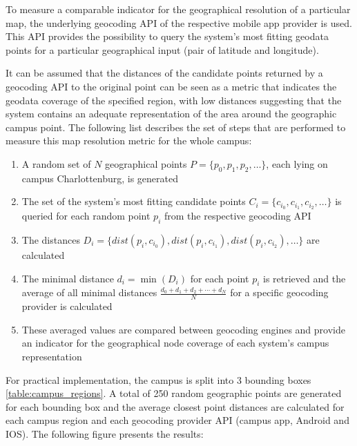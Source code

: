 To measure a comparable indicator for the geographical resolution of a particular map, the underlying geocoding API of the respective mobile app provider is used. This API provides the possibility to query the system's most fitting geodata points for a particular geographical input (pair of latitude and longitude).

It can be assumed that the distances of the candidate points returned by a geocoding API to the original point can be seen as a metric that indicates the geodata coverage of the specified region, with low distances suggesting that the system contains an adequate representation of the area around the geographic campus point. The following list describes the set of steps that are performed to measure this map resolution metric for the whole campus:

\newpage

\begin{enumerate}
    \item A random set of $N$ geographical points $P = \{p_{0}, p_{1}, p_{2}, \ldots\}$, each lying on campus Charlottenburg, is generated
    \item The set of the system's most fitting candidate points $C_{i} = \{c_{i_{0}}, c_{i_{1}}, c_{i_{2}}, \ldots\}$ is queried for each random point $p_{i}$ from the respective geocoding API
    \item The distances $D_{i} = \{dist(p_{i}, c_{i_{0}}), dist(p_{i}, c_{i_{1}}), dist(p_{i}, c_{i_{2}}), \ldots\}$ are calculated
    \item The minimal distance $d_{i} = \min(D_{i})$ for each point $p_{i}$ is retrieved and the average of all minimal distances $\frac{d_{0} + d_{1} + d_{2} + \cdots + d_{N}}{N}$ for a specific geocoding provider is calculated
    \item These averaged values are compared between geocoding engines and provide an indicator for the geographical node coverage of each system's campus representation
\end{enumerate}

\vspace{2mm}

For practical implementation, the campus is split into 3 bounding boxes \ref{table:campus_regions}. A total of 250 random geographic points are generated for each bounding box and the average closest point distances are calculated for each campus region and each geocoding provider API (campus app, Android and IOS). The following figure presents the results:

